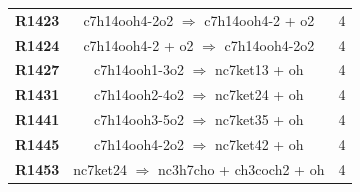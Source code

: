 \begin{table}[!ht]
\begin{tabular}{ccc}
\textbf{R1423} & c7h14ooh4-2o2 $\Rightarrow$ c7h14ooh4-2 + o2 & 4 \\
\textbf{R1424} & c7h14ooh4-2 + o2 $\Rightarrow$ c7h14ooh4-2o2 & 4 \\
\textbf{R1427} & c7h14ooh1-3o2 $\Rightarrow$ nc7ket13 + oh & 4 \\
\textbf{R1431} & c7h14ooh2-4o2 $\Rightarrow$ nc7ket24 + oh & 4 \\
\textbf{R1441} & c7h14ooh3-5o2 $\Rightarrow$ nc7ket35 + oh & 4 \\
\textbf{R1445} & c7h14ooh4-2o2 $\Rightarrow$ nc7ket42 + oh & 4 \\
\textbf{R1453} & nc7ket24 $\Rightarrow$ nc3h7cho + ch3coch2 + oh & 4 \\
\hline
\end{tabular}
\end{table}